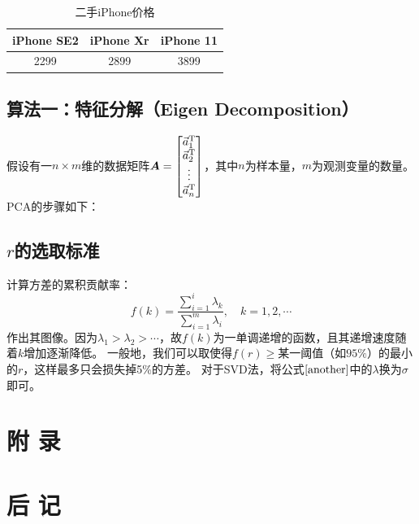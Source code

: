 \documentclass{CUC}
\begin{document}
\begin{table}[ht]
    \centering
    \caption{二手iPhone价格}
    \begin{tabular}{|c|c|c|}
        \hline
        iPhone SE2   &   iPhone Xr   &  iPhone 11   \\
        \hline
        2299         &  2899        &   3899    \\ 
        \hline
    \end{tabular}

    \label{iPhone}
\end{table}

\subsection{算法一：特征分解（Eigen Decomposition）}
假设有一$n\times m$维的数据矩阵$\boldsymbol A = \begin{bmatrix} \vec a_1^{\rm T} \\ \vec a_2^{\rm T} \\ \vdots \\ \vec a_n^{\rm T}      \end{bmatrix}$，其中$n$为样本量，$m$为观测变量的数量。PCA的步骤如下：
\subsection{$r$的选取标准}
计算方差的累积贡献率：
\begin{equation}
  f(k)=\dfrac{\sum _{i=1}^i \lambda_k}{\sum_{i=1}^m \lambda_i},\quad k = 1,2,\cdots
  \label{another}
\end{equation}
作出其图像。因为$\lambda_1> \lambda_2 > \cdots$，故$f(k)$为一单调递增的函数，且其递增速度随着$k$增加逐渐降低。
一般地，我们可以取使得$f(r)\ge $某一阈值（如$95\%$）的最小的$r$，这样最多只会损失掉5\%的方差。
对于SVD法，将公式$\eqref{another}$中的$\lambda$换为$\sigma$即可。

\clearpage



\clearpage
\section*{附 \quad 录}

\clearpage
\section*{后 \quad 记}
\end{document}

